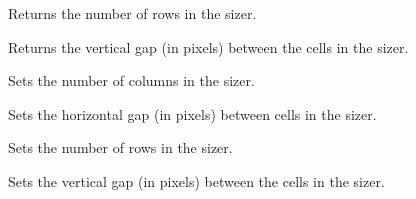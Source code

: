 Returns the number of rows in the sizer.


\label{wxgridsizergetvgap}


Returns the vertical gap (in pixels) between the cells in the sizer.


\label{wxgridsizersetcols}


Sets the number of columns in the sizer.


\label{wxgridsizersethgap}


Sets the horizontal gap (in pixels) between cells in the sizer.


\label{wxgridsizersetrows}


Sets the number of rows in the sizer.


\label{wxgridsizersetvgap}


Sets the vertical gap (in pixels) between the cells in the sizer.




